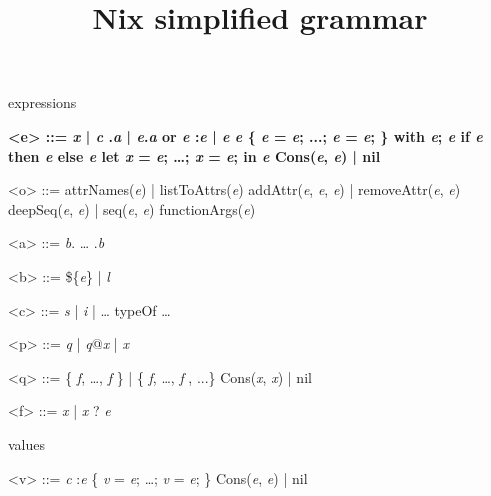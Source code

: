 \documentclass{article}
\title{Nix simplified grammar}
\date{}
\newcommand{\meta}[1]{{\it{#1}}} %
\renewcommand{\|}{\textrm{|}}
\def\e/{\meta{e}}
\def\a/{\meta{a}}
\def\b/{\meta{b}}
\def\c/{\meta{c}}
\def\p/{\meta{p}}
\def\q/{\meta{q}}
\def\f/{\meta{f}}
\def\x/{\meta{x}}
\def\o/{\meta{o}}
\def\v/{\meta{v}}
\begin{document}
\maketitle{}

\par{expressions}

\begin{grammar}
  \bfseries
  <e> ::=
    \x/ \| \c/
    \alt \e/.\a/ \| \e/.\a/ or \e/
    \alt \p/:\e/ \| \e/ \e/
    \alt \{ \e/ = \e/; ...; \e/ = \e/; \}
    \alt with \e/; \e/
    \alt if \e/ then \e/ else \e/
    \alt let \x/ = \e/; \ldots{;} \x/ = \e/; in \e/
    \alt Cons(\e/, \e/) \| nil
    \alt \o/

    <o> ::= attrNames(\e/) \| listToAttrs(\e/)
    \alt addAttr(\e/, \e/, \e/) \| removeAttr(\e/, \e/)
    \alt deepSeq(\e/, \e/) \| seq(\e/, \e/)
    \alt functionArgs(\e/)

  <a> ::= \b/. \ldots{} .\b/

  <b> ::= \$\{\e/\} \| \meta{l}

  <c> ::= \meta{s} \| \meta{i} \| \ldots{}
    \alt typeOf
    \alt \ldots{}

  <p> ::= \q/ \| \q/@\x/ \| \x/

  <q> ::= \{ \f/, \ldots{,} \f/ \} \| \{ \f/, \ldots{,} \f/ , ...\}
    \alt Cons(\x/, \x/) \| nil
    \alt \c/

  <f> ::= \x/ \| \x/ ? \e/

\end{grammar}

\par{values}

\begin{grammar}
  \bfseries

  <v> ::=
    \c/
    \alt \p/:\e/
    \alt \{ \v/ = \e/; \ldots{}; \v/ = \e/; \}
    \alt Cons(\e/, \e/) \| nil
\end{grammar}
\end{document}
